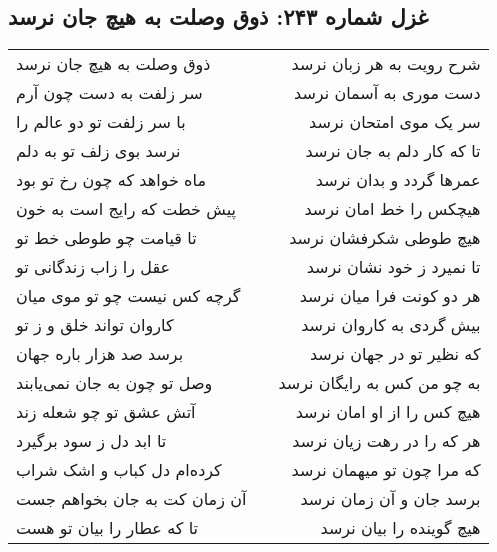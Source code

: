 \begin{center}
\section*{غزل شماره ۲۴۳: ذوق وصلت به هیچ جان نرسد}
\label{sec:243}
\begin{longtable}{l p{0.5cm} r}
ذوق وصلت به هیچ جان نرسد
&&
شرح رویت به هر زبان نرسد
\\
سر زلفت به دست چون آرم
&&
دست موری به آسمان نرسد
\\
با سر زلفت تو دو عالم را
&&
سر یک موی امتحان نرسد
\\
نرسد بوی زلف تو به دلم
&&
تا که کار دلم به جان نرسد
\\
ماه خواهد که چون رخ تو بود
&&
عمرها گردد و بدان نرسد
\\
پیش خطت که رایج است به خون
&&
هیچکس را خط امان نرسد
\\
تا قیامت چو طوطی خط تو
&&
هیچ طوطی شکرفشان نرسد
\\
عقل را زاب زندگانی تو
&&
تا نمیرد ز خود نشان نرسد
\\
گرچه کس نیست چو تو موی میان
&&
هر دو کونت فرا میان نرسد
\\
کاروان تواند خلق و ز تو
&&
بیش گردی به کاروان نرسد
\\
برسد صد هزار باره جهان
&&
که نظیر تو در جهان نرسد
\\
وصل تو چون به جان نمی‌یابند
&&
به چو من کس به رایگان نرسد
\\
آتش عشق تو چو شعله زند
&&
هیچ کس را از او امان نرسد
\\
تا ابد دل ز سود برگیرد
&&
هر که را در رهت زیان نرسد
\\
کرده‌ام دل کباب و اشک شراب
&&
که مرا چون تو میهمان نرسد
\\
آن زمان کت به جان بخواهم جست
&&
برسد جان و آن زمان نرسد
\\
تا که عطار را بیان تو هست
&&
هیچ گوینده را بیان نرسد
\\
\end{longtable}
\end{center}
